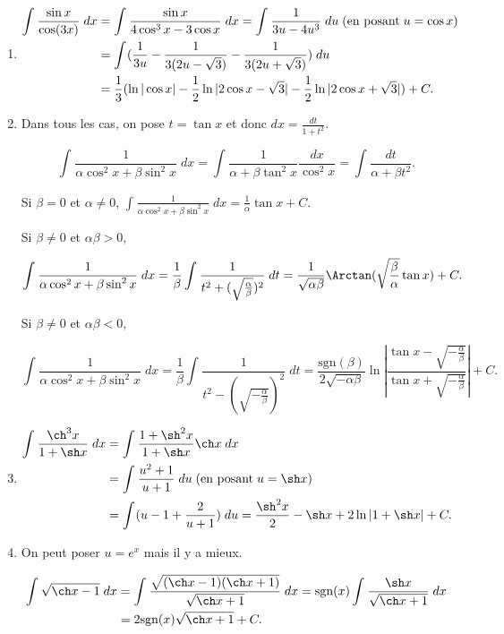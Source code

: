 {{\begin{enumerate}
\item 

\begin{align*}\ensuremath
\int_{}^{}\frac{\sin x}{\cos(3x)}\;dx&=\int_{}^{}\frac{\sin x}{4\cos^3x-3\cos x}\;dx
=\int_{}^{}\frac{1}{3u-4u^3}\;du\;(\mbox{en posant}\;u=\cos x)\\
 &=\int_{}^{}(\frac{1}{3u}-\frac{1}{3(2u-\sqrt{3})}-\frac{1}{3(2u+\sqrt{3})})\;du\\
 &=\frac{1}{3}(\ln|\cos x|-\frac{1}{2}\ln|2\cos x-\sqrt{3}|-\frac{1}{2}\ln|2\cos x+\sqrt{3}|)+C.
\end{align*}
\item  Dans tous les cas, on pose $t=\tan x$ et donc $dx=\frac{dt}{1+t^2}$.

$$\int_{}^{}\frac{1}{\alpha\cos^2x+\beta\sin^2 x}\;dx=\int_{}^{}\frac{1}{\alpha+\beta\tan^2x}\frac{dx}{\cos^2x}=\int_{}^{}\frac{dt}{\alpha+\beta t^2}.$$

Si $\beta=0$ et $\alpha\neq0$, $\int_{}^{}\frac{1}{\alpha\cos^2x+\beta\sin^2x}\;dx=\frac{1}{\alpha}\tan x+C$.

Si $\beta\neq0$ et $\alpha\beta>0$, 

$$\int_{}^{}\frac{1}{\alpha\cos^2x+\beta\sin^2 x}\;dx=\frac{1}{\beta}\int_{}^{}\frac{1}{t^2+(\sqrt{\frac{\alpha}{\beta}})^2}\;dt=\frac{1}{\sqrt{\alpha\beta}}\Arctan(\sqrt{\frac{\beta}{\alpha}}\tan x)+C.$$

Si $\beta\neq0$ et $\alpha\beta<0$, 

$$\int_{}^{}\frac{1}{\alpha\cos^2x+\beta\sin^2 x}\;dx=\frac{1}{\beta}\int_{}^{}\frac{1}{t^2-(\sqrt{-\frac{\alpha}{\beta}})^2}\;dt=\frac{\mbox{sgn}(\beta)}
{2\sqrt{-\alpha\beta}}\ln\left|\frac{\tan x-\sqrt{-\frac{\alpha}{\beta}}}{\tan x+\sqrt{-\frac{\alpha}{\beta}}}\right|+C.$$

\item  \begin{align*}\ensuremath
\int_{}^{}\frac{\ch^3x}{1+\sh x}\;dx&=\int_{}^{}\frac{1+\sh^2x}{1+\sh x}\ch x\;dx\\
 &=\int_{}^{}\frac{u^2+1}{u+1}\;du\;(\mbox{en posant}\;u=\sh x)\\
 &=\int_{}^{}(u-1+\frac{2}{u+1})\;du=\frac{\sh^2x}{2}-\sh x+2\ln|1+\sh x|+C.
\end{align*}
\item  On peut poser $u=e^x$ mais il y a mieux.

\begin{align*}\ensuremath
\int_{}^{}\sqrt{\ch x-1}\;dx&=\int_{}^{}\frac{\sqrt{(\ch x-1)(\ch x+1)}}{\sqrt{\ch x+1}}\;dx=\mbox{sgn}(x)\int_{}^{}\frac{\sh x}{\sqrt{\ch x+1}}\;dx\\
 &=2\mbox{sgn}(x)\sqrt{\ch x+1}+C.
\end{align*}


\end{enumerate}}}
